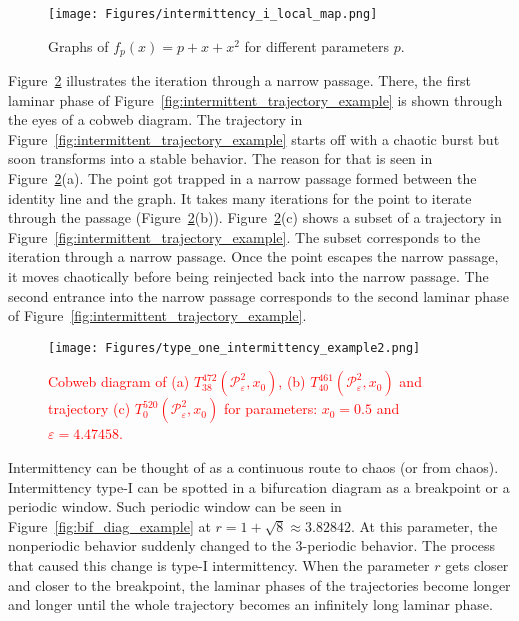 \begin{figure}[!h]
    \centering
    \texttt{[image: Figures/intermittency\_i\_local\_map.png]}
    \caption{
        Graphs of $f_{p}(x) = p + x + x^2$ for different parameters $p$.
    }
    \label{fig:saddle_node_bifurcation}
\end{figure}

\par
Figure~\ref{fig:intermittent_cobweb_example} illustrates the iteration through a narrow passage.
There, the first laminar phase of Figure~\ref{fig:intermittent_trajectory_example} is shown through the eyes of a cobweb diagram.
The trajectory in Figure~\ref{fig:intermittent_trajectory_example} starts off with a chaotic burst but soon transforms into a stable behavior.
The reason for that is seen in Figure~\ref{fig:intermittent_cobweb_example}(a). The point got trapped in a narrow passage formed between the identity line and the graph.
It takes many iterations for the point to iterate through the passage (Figure~\ref{fig:intermittent_cobweb_example}(b)).
Figure~\ref{fig:intermittent_cobweb_example}(c) shows a subset of a trajectory in Figure~\ref{fig:intermittent_trajectory_example}.
The subset corresponds to the iteration through a narrow passage.
Once the point escapes the narrow passage, it moves chaotically before being reinjected back into the narrow passage.
The second entrance into the narrow passage corresponds to the second laminar phase of Figure~\ref{fig:intermittent_trajectory_example}.

\begin{figure}[!h]
    \centering
    \texttt{[image: Figures/type\_one\_intermittency\_example2.png]}
    \caption{
        \textcolor{red}{Cobweb diagram of 
        (a) $T^{472}_{38}(\mathcal{P}_{\varepsilon}^{2}, x_0)$,
        (b) $T^{461}_{40}(\mathcal{P}_{\varepsilon}^{2}, x_0)$ and
        trajectory (c) $T^{520}_{0}(\mathcal{P}_{\varepsilon}^{2}, x_0)$
        for parameters: $x_0 = 0.5$ and $\varepsilon = 4.47458$.}
    }
    \label{fig:intermittent_cobweb_example}
\end{figure}

\par
Intermittency can be thought of as a continuous route to chaos (or from chaos).
Intermittency type-I can be spotted in a bifurcation diagram as a breakpoint or a periodic window.
Such periodic window can be seen in Figure~\ref{fig:bif_diag_example} at $r = 1+\sqrt{8} \approx 3.82842$.
At this parameter, the nonperiodic behavior suddenly changed to the $3$-periodic behavior.
The process that caused this change is type-I intermittency.
When the parameter $r$ gets closer and closer to the breakpoint, the laminar phases of the trajectories become longer and longer until the whole trajectory becomes an infinitely long laminar phase.


